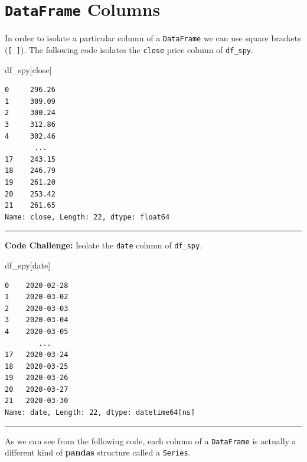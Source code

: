 \documentclass[
  letterpaper,
  DIV=11,
  numbers=noendperiod]{scrreprt}
\newenvironment{Shaded}{\begin{snugshade}}{\end{snugshade}}
\newcommand{\NormalTok}[1]{\textcolor[rgb]{0.00,0.23,0.31}{#1}}
\newcommand{\StringTok}[1]{\textcolor[rgb]{0.13,0.47,0.30}{#1}}
\begin{document}
\hypertarget{dataframe-columns}{%
\section{\texorpdfstring{\texttt{DataFrame}
Columns}{DataFrame Columns}}\label{dataframe-columns}}

In order to isolate a particular column of a \texttt{DataFrame} we can
use square brackets (\texttt{{[}\ {]}}). The following code isolates the
\texttt{close} price column of \texttt{df\_spy}.

\begin{Shaded}
\begin{Highlighting}[]
\NormalTok{df\_spy[}\StringTok{\textquotesingle{}close\textquotesingle{}}\NormalTok{]}
\end{Highlighting}
\end{Shaded}

\begin{verbatim}
0     296.26
1     309.09
2     300.24
3     312.86
4     302.46
       ...  
17    243.15
18    246.79
19    261.20
20    253.42
21    261.65
Name: close, Length: 22, dtype: float64
\end{verbatim}

\begin{center}\rule{0.5\linewidth}{0.5pt}\end{center}

\textbf{Code Challenge:} Isolate the \texttt{date} column of
\texttt{df\_spy}.

\begin{Shaded}
\begin{Highlighting}[]
\NormalTok{df\_spy[}\StringTok{\textquotesingle{}date\textquotesingle{}}\NormalTok{]}
\end{Highlighting}
\end{Shaded}

\begin{verbatim}
0    2020-02-28
1    2020-03-02
2    2020-03-03
3    2020-03-04
4    2020-03-05
        ...    
17   2020-03-24
18   2020-03-25
19   2020-03-26
20   2020-03-27
21   2020-03-30
Name: date, Length: 22, dtype: datetime64[ns]
\end{verbatim}

\begin{center}\rule{0.5\linewidth}{0.5pt}\end{center}

As we can see from the following code, each column of a
\texttt{DataFrame} is actually a different kind of \textbf{pandas}
structure called a \texttt{Series}.
\end{document}
